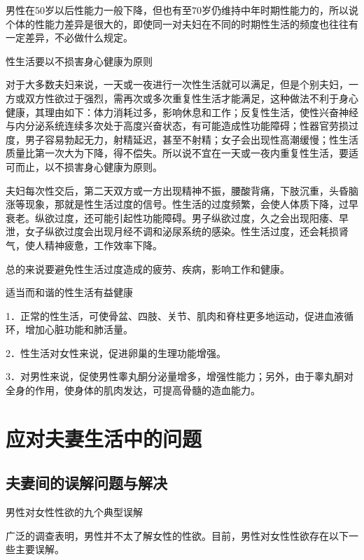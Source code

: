 \documentclass[12pt,UTF8,openany]{ctexbook}
\begin{document}
男性在50岁以后性能力一般下降，但也有至70岁仍维持中年时期性能力的，所以说个体的性能力差异是很大的，即使同一对夫妇在不同的时期性生活的频度也往往有一定差异，不必做什么规定。





性生活要以不损害身心健康为原则


对于大多数夫妇来说，一天或一夜进行一次性生活就可以满足，但是个别夫妇，一方或双方性欲过于强烈，需再次或多次重复性生活才能满足，这种做法不利于身心健康，其理由如下：体力消耗过多，影响休息和工作；反复性生活，使性兴奋神经与内分泌系统连续多次处于高度兴奋状态，有可能造成性功能障碍；性器官劳损过度，男子容易勃起无力，射精延迟，甚至不射精；女子会出现性高潮缓慢；性生活质量比第一次大为下降，得不偿失。所以说不宜在一天或一夜内重复性生活，要适可而止，以不损害身心健康为原则。

夫妇每次性交后，第二天双方或一方出现精神不振，腰酸背痛，下肢沉重，头昏脑涨等现象，那就是性生活过度的信号。性生活的过度频繁，会使人体质下降，过早衰老。纵欲过度，还可能引起性功能障碍。男子纵欲过度，久之会出现阳痿、早泄，女子纵欲过度会出现月经不调和泌尿系统的感染。性生活过度，还会耗损肾气，使人精神疲惫，工作效率下降。

总的来说要避免性生活过度造成的疲劳、疾病，影响工作和健康。





适当而和谐的性生活有益健康


1．正常的性生活，可使骨盆、四肢、关节、肌肉和脊柱更多地运动，促进血液循环，增加心脏功能和肺活量。

2．性生活对女性来说，促进卵巢的生理功能增强。

3．对男性来说，促使男性睾丸酮分泌量增多，增强性能力；另外，由于睾丸酮对全身的作用，使身体的肌肉发达，可提高骨髓的造血能力。





\part{应对夫妻生活中的问题}





\chapter{夫妻间的误解问题与解决}


男性对女性性欲的九个典型误解


广泛的调查表明，男性并不太了解女性的性欲。目前，男性对女性性欲存在以下一些主要误解。
\end{document}
